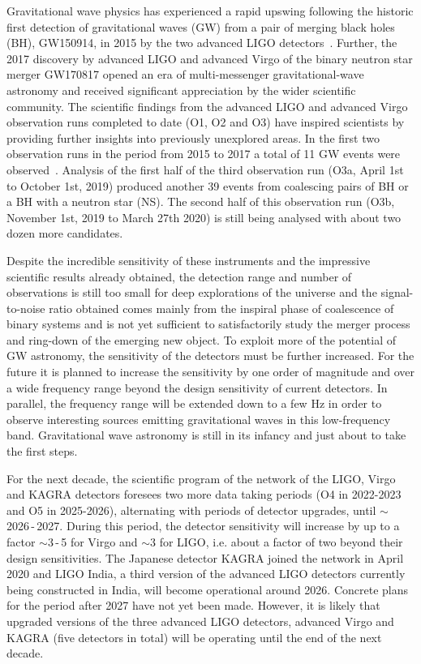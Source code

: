 \documentclass[graybox, nosecnum]{svmult}
\begin{document}
Gravitational wave physics has experienced a rapid upswing following the historic first detection of gravitational waves (GW) from a pair of merging black holes (BH), GW150914, in 2015 by the two advanced LIGO detectors~\cite{aLIGO}. Further, the 2017 discovery by advanced LIGO and advanced Virgo of the binary neutron star merger GW170817 opened an era of multi-messenger gravitational-wave astronomy and received significant appreciation by the wider scientific community. 
The scientific findings from the advanced LIGO and advanced Virgo observation runs completed to date (O1, O2 and O3) have inspired scientists by providing further insights into previously unexplored areas. In the first two observation runs in the period from 2015 to 2017 a total of 11 GW events were observed~\cite{GWTC1-2019}. Analysis of the first half of the third observation run (O3a, April 1st to October 1st, 2019) produced another 39 events from coalescing pairs of BH or a BH with a neutron star (NS)\cite{GWTC2-2020}. The second half of this observation run (O3b, November 1st, 2019 to March 27th 2020) is still being analysed with about two dozen more candidates.  

Despite the incredible sensitivity of these instruments and the impressive scientific results already obtained, the detection range and number of observations is still too small for 
deep explorations of the universe and the signal-to-noise ratio obtained comes mainly from the inspiral phase of coalescence of binary systems and is not yet sufficient to satisfactorily study the merger process and ring-down of the emerging new object. 
To exploit more of the potential of GW astronomy, the sensitivity of the detectors must be further increased. For the future it is planned to increase the sensitivity by one order of magnitude and over a wide frequency range beyond the design sensitivity of current detectors.  In parallel, the frequency range will be extended down to a few Hz in order to observe interesting sources emitting gravitational waves in this low-frequency band.
Gravitational wave astronomy is still in its infancy and just about to take the first steps.

For the next decade, the scientific program of the network of the LIGO, Virgo and KAGRA detectors foresees two more data taking periods (O4 in 2022-2023 and O5 in 2025-2026), alternating with periods of detector upgrades, until $\sim$2026\,-\,2027. During this period, the detector sensitivity will increase by up to a factor $\sim$3\,-\,5 for Virgo and $\sim3$ for LIGO, i.e. about a factor of two beyond their design sensitivities. The Japanese detector KAGRA joined the network in April 2020 and LIGO India, a third version of the advanced LIGO detectors currently being constructed in India, will become operational around 2026. Concrete plans for the period after 2027 have not yet been made. However, it is likely that upgraded versions of the three advanced LIGO detectors, advanced Virgo and KAGRA  (five detectors in total) will be operating until the end of the next decade. 
\end{document}
